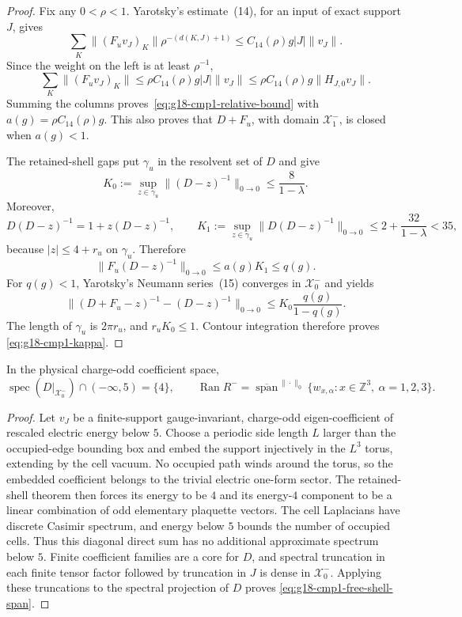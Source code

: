 \begin{proof}
Fix any $0<\rho<1$.  Yarotsky's estimate~(14), for an input of exact
support $J$, gives
\[
 \sum_K\|(F_uv_J)_K\|\rho^{-(d(K,J)+1)}
 \le C_{14}(\rho)g|J|\|v_J\|.
\]
Since the weight on the left is at least $\rho^{-1}$,
\[
 \sum_K\|(F_uv_J)_K\|
 \le \rho C_{14}(\rho)g|J|\|v_J\|
 \le \rho C_{14}(\rho)g\|H_{J,0}v_J\|.
\]
Summing the columns proves~\eqref{eq:g18-cmp1-relative-bound} with
$a(g)=\rho C_{14}(\rho)g$.  This also proves that $D+F_u$, with domain
$\mathcal X_1^-$, is closed when $a(g)<1$.

 The retained-shell gaps put $\gamma_u$ in the resolvent set of $D$ and give
 \[
  K_0:=\sup_{z\in\gamma_u}\|(D-z)^{-1}\|_{0\to0}
  \le\frac8{1-\lambda}.
 \]
 Moreover,
 \[
  D(D-z)^{-1}=1+z(D-z)^{-1},
  \qquad
  K_1:=\sup_{z\in\gamma_u}\|D(D-z)^{-1}\|_{0\to0}
  \le2+\frac{32}{1-\lambda}<35,
 \]
 because $|z|\le4+r_u$ on $\gamma_u$.  Therefore
\[
 \|F_u(D-z)^{-1}\|_{0\to0}\le a(g)K_1\le q(g).
\]
For $q(g)<1$, Yarotsky's Neumann series~(15) converges in
$\mathcal X_0^-$ and yields
\[
 \|(D+F_u-z)^{-1}-(D-z)^{-1}\|_{0\to0}
 \le K_0\frac{q(g)}{1-q(g)}.
\]
 The length of $\gamma_u$ is $2\pi r_u$, and
 $r_uK_0\le1$.  Contour integration therefore proves
 \eqref{eq:g18-cmp1-kappa}.
\end{proof}

\begin{lemma}
\label{lem:g18-cmp1-finite-support-shell-bridge}
In the physical charge-odd coefficient space,
\begin{equation}
 \operatorname{spec}(D|_{\mathcal X_0^-})\cap(-\infty,5)=\{4\},
 \qquad
 \operatorname{Ran}R^-
 =\overline{\operatorname{span}}^{\,\|\cdot\|_0}
   \{w_{x,\alpha}:x\in\mathbb Z^3,\ \alpha=1,2,3\}.
 \label{eq:g18-cmp1-free-shell-span}
\end{equation}
\end{lemma}

\begin{proof}
Let $v_J$ be a finite-support gauge-invariant, charge-odd eigen-coefficient
of rescaled electric energy below $5$.  Choose a periodic side length $L$
larger than the occupied-edge bounding box and embed the support injectively
in the $L^3$ torus, extending by the cell vacuum.  No occupied path winds
  around the torus, so the embedded coefficient belongs to the trivial
  electric one-form sector.  The retained-shell theorem then forces its energy
  to be $4$ and its energy-$4$ component to be a linear combination of odd
  elementary plaquette vectors.  The cell Laplacians have discrete Casimir
  spectrum, and energy below $5$ bounds the number of occupied cells.  Thus
  this diagonal direct sum has no additional approximate spectrum below $5$.
  Finite coefficient families are a core for
$D$, and spectral truncation in each finite tensor factor followed by
truncation in $J$ is dense in $\mathcal X_0^-$.  Applying these truncations
to the spectral projection of $D$ proves
\eqref{eq:g18-cmp1-free-shell-span}.
\end{proof}

